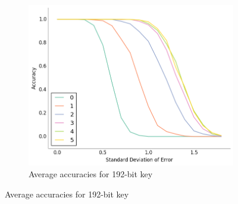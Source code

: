 \documentclass{project-logbook}
\begin{document}
{\begin{figure}[htp]
\begin{subfigure}{0.48\textwidth}
        \includegraphics[width=\textwidth]{figures/accuracy_192.png}
        \caption{Average accuracies for 192-bit key}
    \end{subfigure}%


\end{figure}}
\end{document}
